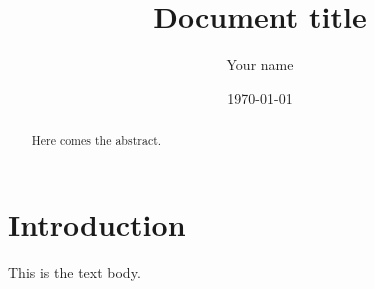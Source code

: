 \documentclass[reqno, a4paper]{amsart}
\title[]{Document title}
\date{\today}
\author{Your name}
\begin{document}
\begin{abstract}
  Here comes the abstract.
\end{abstract}

\maketitle



%

\section{Introduction}
\label{sec:introduction}


This is the text body.




\end{document}
